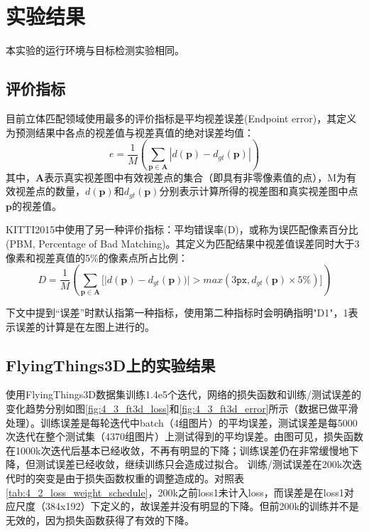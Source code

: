 \section{实验结果}
本实验的运行环境与目标检测实验相同。

\subsection{评价指标}
目前立体匹配领域使用最多的评价指标是平均视差误差(Endpoint error)，其定义为预测结果中各点的视差值与视差真值的绝对误差均值：
\begin{equation}\label{eq:4_3_endpoint_error}
e = \frac{1}{M} \left( \sum_{\mathbf{p} \in \mathbf{A}} | d(\mathbf{p}) - d_{gt}(\mathbf{p}) | \right)
\end{equation}
其中，$\mathbf{A}$表示真实视差图中有效视差点的集合（即具有非零像素值的点），M为有效视差点的数量，$d(\mathbf{p})$和$d_{gt}(\mathbf{p})$分别表示计算所得的视差图和真实视差图中点$\mathbf{p}$的视差值。

KITTI2015中使用了另一种评价指标：平均错误率(D)，或称为误匹配像素百分比(PBM, Percentage of Bad Matching)。其定义为匹配结果中视差值误差同时大于3像素和视差真值的5\%的像素点所占比例：
\begin{equation}\label{eq:4_3_D1_error}
D = \frac{1}{M}\left( \sum_{\mathbf{p} \in \mathbf{A}} \Big[ \big| d(\mathbf{p}) - d_{gt}(\mathbf{p})) \big| > max(3\mathtt{px}, d_{gt}(\mathbf{p}) \times 5\%) \Big] \right)
\end{equation}

下文中提到“误差”时默认指第一种指标，使用第二种指标时会明确指明"D1"，1表示误差的计算是在左图上进行的。

\subsection{FlyingThings3D上的实验结果}
使用FlyingThings3D数据集训练1.4e5个迭代，网络的损失函数和训练/测试误差的变化趋势分别如图\ref{fig:4_3_ft3d_loss}和\ref{fig:4_3_ft3d_error}所示（数据已做平滑处理）。训练误差是每轮迭代中batch（4组图片）的平均误差，测试误差是每5000次迭代在整个测试集（4370组图片）上测试得到的平均误差。由图可见，损失函数在1000k次迭代后基本已经收敛，不再有明显的下降；训练误差仍在非常缓慢地下降，但测试误差已经收敛，继续训练只会造成过拟合。
训练/测试误差在200k次迭代时的突变是由于损失函数权重的调整造成的。对照表\ref{tab:4_2_loss_weight_schedule}，200k之前loss1未计入loss，而误差是在loss1对应尺度（384x192）下定义的，故误差并没有明显的下降。但前200k的训练并不是无效的，因为损失函数获得了有效的下降。


